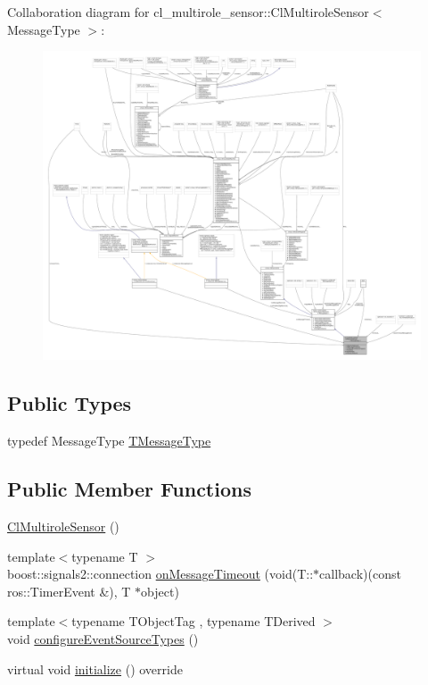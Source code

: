 Collaboration diagram for cl\+\_\+multirole\+\_\+sensor\+:\+:Cl\+Multirole\+Sensor$<$ Message\+Type $>$\+:
\nopagebreak
\begin{figure}[H]
\begin{center}
\leavevmode
\includegraphics[width=350pt]{classcl__multirole__sensor_1_1ClMultiroleSensor__coll__graph}
\end{center}
\end{figure}
\subsection*{Public Types}
\begin{DoxyCompactItemize}
\item 
typedef Message\+Type \hyperlink{classcl__multirole__sensor_1_1ClMultiroleSensor_a76f2c1e5c54556bacdaf0aaf809972da}{T\+Message\+Type}
\end{DoxyCompactItemize}
\subsection*{Public Member Functions}
\begin{DoxyCompactItemize}
\item 
\hyperlink{classcl__multirole__sensor_1_1ClMultiroleSensor_a25fcca3996fb5cbd5aa46cae4170e75e}{Cl\+Multirole\+Sensor} ()
\item 
{\footnotesize template$<$typename T $>$ }\\boost\+::signals2\+::connection \hyperlink{classcl__multirole__sensor_1_1ClMultiroleSensor_a9a2ffac7f03e1570bedc246ea4b00078}{on\+Message\+Timeout} (void(T\+::$\ast$callback)(const ros\+::\+Timer\+Event \&), T $\ast$object)
\item 
{\footnotesize template$<$typename T\+Object\+Tag , typename T\+Derived $>$ }\\void \hyperlink{classcl__multirole__sensor_1_1ClMultiroleSensor_a48474056b15f9cb24c5582bfbd228187}{configure\+Event\+Source\+Types} ()
\item 
virtual void \hyperlink{classcl__multirole__sensor_1_1ClMultiroleSensor_a3847e19f925f65dd034964eb2d0b3594}{initialize} () override
\end{DoxyCompactItemize}
